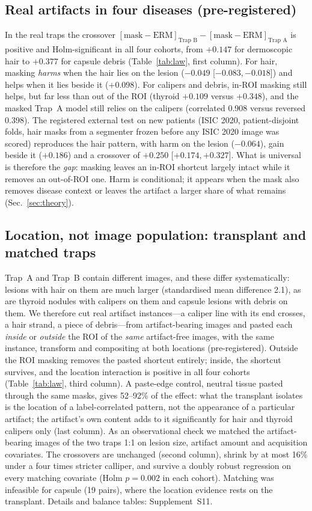 \subsection{Real artifacts in four diseases (pre-registered)}
In the real traps the crossover $[\text{mask}-\text{ERM}]_{\text{Trap B}}-[\text{mask}-\text{ERM}]_{\text{Trap A}}$ is
positive and Holm-significant in all four cohorts, from $+0.147$ for dermoscopic hair to $+0.377$ for capsule debris
(Table~\ref{tab:law}, first column). For hair, masking \emph{harms} when the hair lies on the lesion ($-0.049$
[$-0.083, -0.018$]) and helps when it lies beside it ($+0.098$). For calipers and debris, in-ROI masking still helps,
but far less than out of the ROI (thyroid $+0.109$ versus $+0.348$), and the masked Trap~A model still relies on the
calipers (correlated 0.908 versus reversed 0.398). The registered external test on new patients (ISIC 2020,
patient-disjoint folds, hair masks from a segmenter frozen before any ISIC 2020 image was scored) reproduces the hair
pattern, with harm on the lesion ($-0.064$), gain beside it ($+0.186$) and a crossover of $+0.250$ [$+0.174, +0.327$].
What is universal is therefore the \emph{gap}: masking leaves an in-ROI shortcut largely intact while it removes an
out-of-ROI one. Harm is conditional; it appears when the mask also removes disease context or leaves the artifact a
larger share of what remains (Sec.~\ref{sec:theory}).

\subsection{Location, not image population: transplant and matched traps}\label{sec:transplant}\label{sec:matched}
Trap~A and Trap~B contain different images, and these differ systematically: lesions with hair on them are much larger
(standardised mean difference 2.1), as are thyroid nodules with calipers on them and capsule lesions with debris on
them. We therefore cut real artifact instances---a caliper line with its end crosses, a hair strand, a piece of
debris---from artifact-bearing images and pasted each \emph{inside} or \emph{outside} the ROI of the \emph{same}
artifact-free images, with the same instance, transform and compositing at both locations (pre-registered). Outside
the ROI masking removes the pasted shortcut entirely; inside, the shortcut survives, and the location interaction is
positive in all four cohorts (Table~\ref{tab:law}, third column). A paste-edge control, neutral tissue pasted through the
same masks, gives 52--92\% of the effect: what the transplant isolates is the location of a label-correlated pattern,
not the appearance of a particular artifact; the artifact's own content adds to it significantly for hair and thyroid
calipers only (last column). As an observational check we matched the artifact-bearing images of the two traps 1:1 on
lesion size, artifact amount and acquisition covariates. The crossovers are unchanged (second column), shrink by at most
16\% under a four times stricter calliper, and survive a doubly robust regression on every matching covariate (Holm
$p=0.002$ in each cohort). Matching was infeasible for capsule (19 pairs), where the location evidence rests on the
transplant. Details and balance tables: Supplement~S11.


